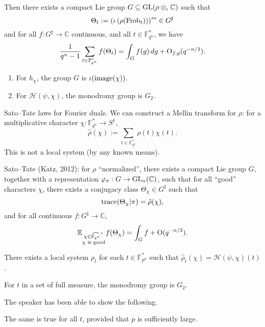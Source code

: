 \documentclass[reqno]{amsart} 
\begin{document}
Then there exists a compact Lie group $G \subseteq \operatorname{GL} (\rho \otimes_\iota \mathbb{C} )$ such that
\begin{equation*}
  \Theta_t := \left( \iota \left( \rho(\operatorname{Frob}_t) \right) \right)^{ss} \in G^{\sharp}
\end{equation*}
and for all $f : G^\sharp \rightarrow \mathbb{C}$ continuous, and all $t \in \mathbb{F}_{q^n }^\ast $, we have
\begin{equation*}
  \frac{1}{q^n - 1 }
  \sum_{t \in \mathbb{F}_{q^n}^\ast }
  f (\Theta_t ) = \int_{G } f (g ) \, d g
  +
  \operatorname{O}_{f, g} (q^{- n/2}).
\end{equation*}
\begin{example}
  \begin{enumerate}
  \item For $h_\chi $, the group $G$ is $\iota (\operatorname{image}(\chi))$.
  \item For $\mathcal{H} (\psi, \chi )$, the monodromy group is $G_2$.
  \end{enumerate}
\end{example}

Sato--Tate laws for Fourier duals.  We can construct a Mellin transform for $\rho$: for a multiplicative character $\chi : \mathbb{F}_{q^n }^\ast \rightarrow S^1$,
\begin{equation*}
  \hat{\rho } (\chi) := \sum_{t \in \mathbb{F}_{q^n }^\ast } \rho (t) \chi (t).
\end{equation*}
This is not a local system (by any known means).

Sato--Tate (Katz, 2012): for $\rho$ ``normalized'', there exists a compact Lie group $G$, together with a representation $\varphi_\pi : G \rightarrow \operatorname{GL}_n(\mathbb{C})$, such that for all ``good'' characters $\chi$, there exists a conjugacy class $\Theta_\chi \in G^\sharp$ such that
\begin{equation*}
  \operatorname{trace} (\Theta_\chi | \pi ) = \hat{\rho} (\chi),
\end{equation*}
and for all continuous $f : G^\sharp \rightarrow \mathbb{C}$,
\begin{equation*}
  \mathbb{E}_{
    \substack{
      \chi \in \widehat{\mathbb{F}_{q^n }}^\ast  \\
      \chi \text{ is good}
    }
  }
  f (\Theta_\chi )
  = \int_G f + \operatorname{O} (q^{- n/2}).
\end{equation*}

\begin{example}
  There exists a local system $\rho_t $ for each $t \in \mathbb{F}_{p^n }^\ast $ such that $\hat{\rho }_t (\chi ) = \mathcal{H} (\psi, \chi ) (t)$.
\end{example}
\begin{theorem}[Katz]
  For $t$ in a set of full measure, the monodromy group is $G_2$.
\end{theorem}
The speaker has been able to show the following.
\begin{theorem}
  The same is true for all $t$, provided that $p$ is sufficiently large.
\end{theorem}
\end{document}
